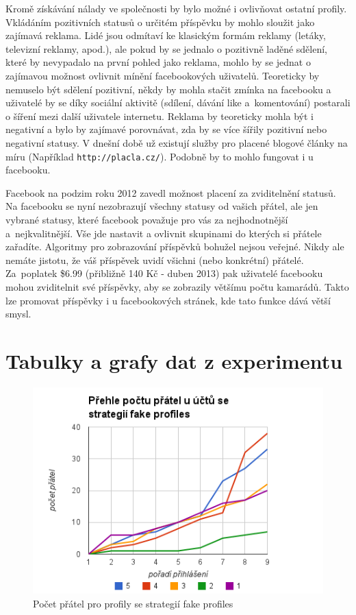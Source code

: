 \documentclass[thesis=M,czech]{FITthesis}[2013/05/10]
\begin{document}
Kromě získávání nálady ve společnosti by bylo možné i ovlivňovat ostatní profily. Vkládáním pozitivních statusů o určitém příspěvku by mohlo sloužit jako zajímavá reklama. Lidé jsou odmítaví ke klasickým formám reklamy (letáky, televizní reklamy, apod.), ale pokud by se jednalo o pozitivně laděné sdělení, které by nevypadalo na první pohled jako reklama, mohlo by se jednat o zajímavou možnost ovlivnit mínění facebookových uživatelů. Teoreticky by nemuselo být sdělení pozitivní, někdy by mohla stačit zmínka na facebooku a uživatelé by se díky sociální aktivitě (sdílení, dávání like a~komentování) postarali o šíření mezi další uživatele internetu. Reklama by teoreticky mohla být i negativní a bylo by zajímavé porovnávat, zda by se více šířily pozitivní nebo negativní statusy. V dnešní době už existují služby pro placené blogové články na míru (Například \verb|http://placla.cz/|). Podobně by to mohlo fungovat i u facebooku.

Facebook na podzim roku 2012 zavedl možnost placení za zviditelnění statusů. Na facebooku se nyní nezobrazují všechny statusy od vašich přátel, ale jen vybrané statusy, které facebook považuje pro vás za nejhodnotnější a~nejkvalitnější. Vše jde nastavit a ovlivnit skupinami do kterých si přátele zařadíte. Algoritmy pro zobrazování příspěvků bohužel nejsou veřejné. Nikdy ale nemáte jistotu, že váš příspěvek uvidí všichni (nebo konkrétní) přátelé. Za~poplatek \$6.99 (přibližně 140 Kč - duben 2013) pak uživatelé facebooku mohou zviditelnit své příspěvky, aby se zobrazily většímu počtu kamarádů. Takto lze promovat příspěvky i u facebookových stránek, kde tato funkce dává větší smysl.







\appendix

\chapter{Tabulky a grafy dat z experimentu}


\begin{figure}[h]
\includegraphics[width=5in]{figures/levelFake.png}
\caption{Počet přátel pro profily se strategií fake profiles}
\label{fig:levelFake}
\end{figure}
\end{document}
